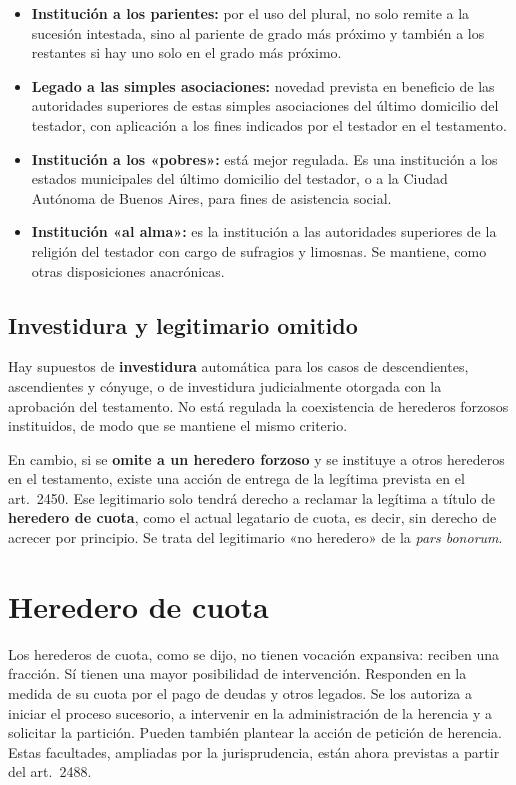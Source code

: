 \documentclass[12pt,oneside]{book}
\begin{document}
\begin{itemize}
    \item \textbf{Institución a los parientes:} por el uso del plural, no solo remite a la sucesión intestada, sino al pariente de grado más próximo y también a los restantes si hay uno solo en el grado más próximo.
    \item \textbf{Legado a las simples asociaciones:} novedad prevista en beneficio de las autoridades superiores de estas simples asociaciones del último domicilio del testador, con aplicación a los fines indicados por el testador en el testamento.
    \item \textbf{Institución a los «pobres»:} está mejor regulada. Es una institución a los estados municipales del último domicilio del testador, o a la Ciudad Autónoma de Buenos Aires, para fines de asistencia social.
    \item \textbf{Institución «al alma»:} es la institución a las autoridades superiores de la religión del testador con cargo de sufragios y limosnas. Se mantiene, como otras disposiciones anacrónicas.
\end{itemize}

\subsection{Investidura y legitimario omitido}

Hay supuestos de \textbf{investidura} automática para los casos de descendientes, ascendientes y cónyuge, o de investidura judicialmente otorgada con la aprobación del testamento. No está regulada la coexistencia de herederos forzosos instituidos, de modo que se mantiene el mismo criterio.

En cambio, si se \textbf{omite a un heredero forzoso} y se instituye a otros herederos en el testamento, existe una acción de entrega de la legítima prevista en el art.~2450. Ese legitimario solo tendrá derecho a reclamar la legítima a título de \textbf{heredero de cuota}, como el actual legatario de cuota, es decir, sin derecho de acrecer por principio. Se trata del legitimario «no heredero» de la \emph{pars bonorum}.

\section{Heredero de cuota}

Los herederos de cuota, como se dijo, no tienen vocación expansiva: reciben una fracción. Sí tienen una mayor posibilidad de intervención. Responden en la medida de su cuota por el pago de deudas y otros legados. Se los autoriza a iniciar el proceso sucesorio, a intervenir en la administración de la herencia y a solicitar la partición. Pueden también plantear la acción de petición de herencia. Estas facultades, ampliadas por la jurisprudencia, están ahora previstas a partir del art.~2488.
\end{document}
